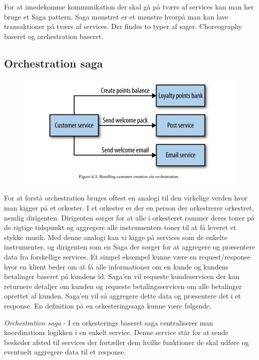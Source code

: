 \documentclass[12pt]{article} %
\begin{document}
\noindent
For at imødekomme kommunikation der skal gå på tværs af services kan man her bruge et Saga pattern. Saga mønstret er et mønstre hvorpå man kan lave transaktioner på tværs af services. Der findes to typer af sager. Choreography baseret og orchestration baseret\cite{richardson2019microservices}.

\subsection{ Orchestration saga }

\begin{figure}[h]
\includegraphics[width=1\textwidth]{orchestrationsaga}
  \caption{\cite[p.~91]{newman2015building}}
\end{figure}

\noindent
For at forstå orchestration bruges oftest en analogi til den virkelige verden hvor man kigger på et orkester. I et orkester er der en person der orkestrerer orkestret, nemlig dirigenten. Dirigenten sørger for at alle i orkesteret rammer deres toner på de rigtige tidspunkt og aggregere alle instrumenters toner til at få leveret et stykke musik. Med denne analogi kan vi kigge på services som de enkelte instrumenter, og dirigenten som en Saga der sørger for at aggregere og præsentere data fra forskellige services. Et simpel eksempel kunne være en request/response hvor en klient beder om at få alle informationer om en kunde og kundens betalinger baseret på kundens id. Saga'en vil requeste kundeservicen der kan returnere detaljer om kunden og requeste betalingsservicen om alle betalinger oprettet af kunden. Saga'en vil så aggregere dette data og præsentere det i et response. En definition på en orkesteringssaga kunne være følgende.
\newline

\emph{Orchestration saga} - I en orkesterings baseret saga centraliserer man koordinations logikken i en enkelt service. Denne service står for at sende beskeder afsted til services der fortæller dem hvilke funktioner de skal udføre og eventuelt aggregere data til et response\cite{richardson2019microservices}.
\end{document}
